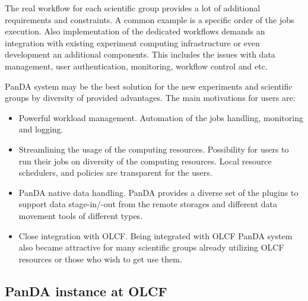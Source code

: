 The real workflow for each scientific group provides a lot of additional
requirements and constraints. A common example is a specific order of the jobs
execution. Also implementation of the dedicated workflows demands an
integration with existing experiment computing infrastructure or even
development an additional components. This includes the issues with data
management, user authentication, monitoring, workflow control and etc.

PanDA system may be the best solution for the new experiments and scientific groups by diversity of provided advantages. The main motivations for users are:
\begin{itemize}
    \item Powerful workload management. Automation of the jobs handling,
        monitoring and logging.
    \item Streamlining the usage of the computing resources. Possibility for
        users to run their jobs on diversity of the computing resources. Local
        resource schedulers, and policies are transparent for the users.
    \item PanDA native data handling. PanDA provides a diverse set of the
        plugins to support data stage-in/-out from the remote storages and
        different data movement tools of different types.
    \item Close integration with OLCF. Being integrated with OLCF PanDA system
        also became attractive for many scientific groups already utilizing
        OLCF resources or those who wish to get use them. 
\end{itemize}

\subsection{PanDA instance at OLCF}
\label{subsec:panda_instance}

